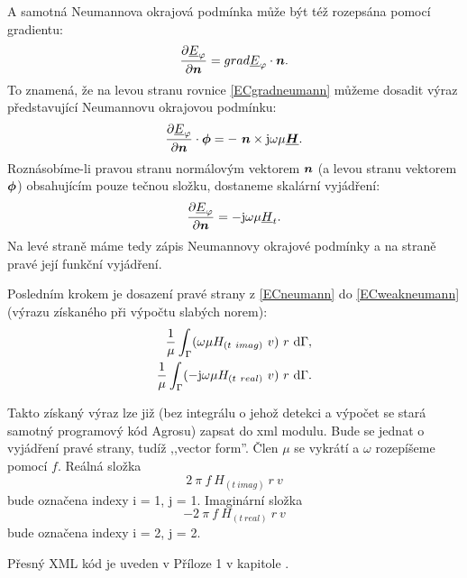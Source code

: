 \documentclass[12pt,a4paper,oneside]{article}
\numberwithin{equation}{section} %
\numberwithin{figure}{section} %
\numberwithin{table}{section} %
\newcommand{\mj}{\mathrm{j}} %
\renewcommand{\vec}[1]{\mbox{\boldmath$#1$}} %
\newcommand{\faz}[1]{{\underline{#1}}} %
\begin{document}
A samotná Neumannova okrajová podmínka může být též rozepsána pomocí gradientu:
\begin{equation}
\label{ECgradneumann}
\frac{\partial \faz{E} _{\varphi}}{\partial \vec{n}} = grad \faz{E} _{\varphi} \cdot \vec{n} .
\end{equation}
To znamená, že na levou stranu rovnice \ref{ECgradneumann} můžeme dosadit výraz představující Neumannovu okrajovou podmínku:
\begin{equation}
\label{NeumannECvek}
\frac{\partial \faz{E}_{\varphi}}{\partial \vec{n}} \cdot \vec{\phi} = - ~ \vec{n} \times \mj \omega \mu \faz{\vec{H}} .
\end{equation}
Roznásobíme-li pravou stranu normálovým vektorem $\vec{n}$ (a levou stranu vektorem $\vec{\phi}$) obsahujícím pouze tečnou složku, dostaneme skalární vyjádření:
\begin{equation}
\label{ECneumann}
\frac{\partial \faz{E}_{\varphi}}{\partial \vec{n}} = - \mj \omega \mu \faz{H}_t .
\end{equation}
Na levé straně máme tedy zápis Neumannovy okrajové podmínky a na straně pravé její funkční vyjádření.

Posledním krokem je dosazení pravé strany z \ref{ECneumann} do \ref{ECweakneumann} (výrazu získaného při výpočtu slabých norem):
\begin{subequations}
\begin{align}
\frac{1}{\mu} \int _{\Gamma} ( \omega \mu H_{(t~imag)} ~ v ) ~ r ~ \ud \Gamma ,
\\ 
\frac{1}{\mu} \int _{\Gamma} ( - \mj \omega \mu H_{(t~real)} ~ v ) ~ r ~ \ud \Gamma .
\end{align}
\end{subequations}

Takto získaný výraz lze již (bez integrálu o jehož detekci a výpočet se stará samotný programový kód Agrosu) zapsat do xml modulu. Bude se jednat o vyjádření pravé strany, tudíž ,,vector form''. Člen $\mu$ se vykrátí a $\omega$ rozepíšeme pomocí $f$. Reálná složka 
\begin{equation}
2 ~ \pi ~ f ~ H_{(t~imag)} ~ r ~ v
\end{equation} 
bude označena indexy i = 1, j = 1. Imaginární složka 
\begin{equation}
- 2 ~ \pi ~ f ~ H_{(t~real)} ~ r ~ v
\end{equation}
bude označena indexy i = 2, j = 2.

Přesný XML kód je uveden v Příloze 1 v kapitole .
\end{document}
